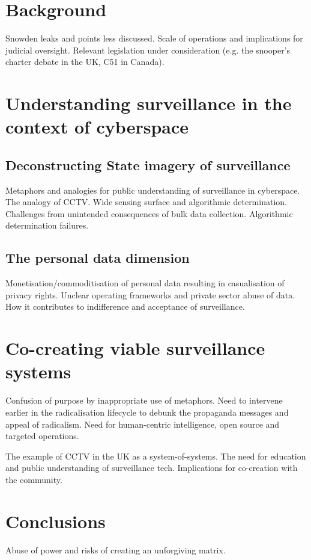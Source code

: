 \documentclass{llncs}
\begin{document}
\section{Background}
\label{sec:Background}
Snowden leaks and points less discussed. Scale of operations and implications for judicial oversight. Relevant legislation under consideration (e.g. the snooper's charter debate in the UK, C51 in Canada).

\section{Understanding surveillance in the context of cyberspace}
\label{sec:Understanding}
\subsection{Deconstructing State imagery of surveillance}
Metaphors and analogies for public understanding of surveillance in cyberspace. The analogy of CCTV. Wide sensing surface and algorithmic determination. Challenges from unintended consequences of bulk data collection. Algorithmic determination failures.
\subsection{The personal data dimension}
Monetisation/commoditisation of personal data resulting in casualisation of privacy rights. Unclear operating frameworks and private sector abuse of data. How it contributes to indifference and acceptance of surveillance.

\section{Co-creating viable surveillance systems}
\label{sec:Creating}
Confusion of purpose by inappropriate use of metaphors. Need to intervene earlier in the radicalisation lifecycle to debunk the propaganda messages and appeal of radicalism. Need for human-centric intelligence, open source and targeted operations.

The example of CCTV in the UK as a system-of-systems. The need for education and public understanding of surveillance tech. Implications for co-creation with the community.

\section{Conclusions}
\label{sec:Conclusions}
Abuse of power and risks of creating an unforgiving matrix.
\end{document}
